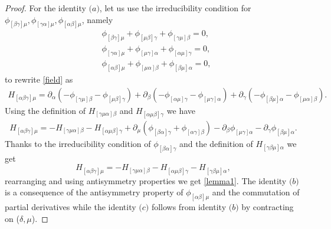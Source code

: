 \documentclass[a4paper,12pt]{article}
\begin{document}
\begin{proof}
For the identity $\textit{(a)}$, let us use the irreducibility condition for
$\phi_{[\beta\gamma]\mu},\phi_{[\gamma\alpha]\mu},\phi_{[\alpha\beta]\mu}$, namely
\begin{equation*}
\begin{aligned}
&\phi_{[\beta\gamma]\mu}+\phi_{[\mu\beta]\gamma}+\phi_{[\gamma\mu]\beta}=0,\\
&\phi_{[\gamma\alpha]\mu}+\phi_{[\mu\gamma]\alpha}+\phi_{[\alpha\mu]\gamma}=0,\\
&\phi_{[\alpha\beta]\mu}+\phi_{[\mu\alpha]\beta}+\phi_{[\beta\mu]\alpha}=0,
\end{aligned}
\end{equation*}
to rewrite \eqref{field} as
\begin{equation*}
\begin{aligned}
H_{[\alpha\beta\gamma]\mu}
=
\partial_{\alpha}(-\phi_{[\gamma\mu]\beta}-\phi_{[\mu\beta]\gamma})
+\partial_{\beta}(-\phi_{[\alpha\mu]\gamma}-\phi_{[\mu\gamma]\alpha})+\partial_{\gamma}(-\phi_{[\beta\mu]\alpha}-\phi_{[\mu\alpha]\beta}) .
\end{aligned}
\end{equation*}
Using the definition of $H_{[\gamma\mu\alpha]\beta}$ and
$H_{[\alpha\mu\beta]\gamma}$ we have
\begin{equation*}
\begin{aligned}
H_{[\alpha\beta\gamma]\mu}
=
- H_{[\gamma\mu\alpha]\beta}
- H_{[\alpha\mu\beta]\gamma}
+\partial_{\mu}(\phi_{[\beta\alpha]\gamma}+\phi_{[\alpha\gamma]\beta})-\partial_{\beta}\phi_{[\mu\gamma]\alpha}
-\partial_{\gamma}\phi_{[\beta\mu]\alpha}.
\end{aligned}
\end{equation*}
Thanks to the irreducibility condition of $\phi_{[\beta\alpha]\gamma}$ and the definition of
$H_{[\gamma\beta\mu]\alpha}$ we get
\begin{equation*}
H_{[\alpha\beta\gamma]\mu}
=
- H_{[\gamma\mu\alpha]\beta}
- H_{[\alpha\mu\beta]\gamma}
- H_{[\gamma\beta\mu]\alpha},
\end{equation*}
rearranging and using antisymmetry properties we get \eqref{lemma1}.
The identity $\textit{(b)}$ is a consequence of the antisymmetry property of $\phi_{[\alpha \beta]\mu}$ and the commutation of partial derivatives while the identity $\textit{(c)}$ follows from identity $\textit{(b)}$ by contracting on ($\delta, \mu$). 
\end{proof}
\end{document}
